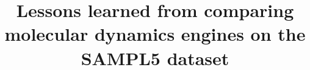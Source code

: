 %
%
%
%
%
%
\RequirePackage{fix-cm}
%
\documentclass[smallextended]{svjour3}       %
%
\smartqed  %
%
\usepackage{graphicx}
\usepackage{tabulary}
%
%
\usepackage{array}
\usepackage{color}
\usepackage{caption}
\usepackage{float}
\usepackage{amssymb}
\usepackage{multirow}
\usepackage{multirow}
\usepackage[numbers, square,sort&compress]{natbib}
\graphicspath{{figures/}}
%
\newcommand{\BibTex}{\textsc{Bib}\TeX}
\newcommand{\erfc}{\mathrm{erfc}}
%
%


\title{Lessons learned from comparing molecular dynamics engines on the SAMPL5 dataset}

